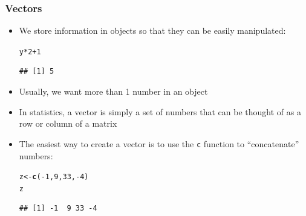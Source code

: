 \documentclass[color=usenames,dvipsnames]{beamer}\usepackage[]{graphicx}\usepackage[]{color}
\makeatletter
\newcommand{\hlnum}[1]{\textcolor[rgb]{0.686,0.059,0.569}{#1}}%
\newcommand{\hlopt}[1]{\textcolor[rgb]{0,0,0}{#1}}%
\newcommand{\hlstd}[1]{\textcolor[rgb]{0.345,0.345,0.345}{#1}}%
\newcommand{\hlkwb}[1]{\textcolor[rgb]{0.69,0.353,0.396}{#1}}%
\newcommand{\hlkwd}[1]{\textcolor[rgb]{0.737,0.353,0.396}{\textbf{#1}}}%
\newenvironment{kframe}{%
 \def\at@end@of@kframe{}%
 \ifinner\ifhmode%
  \def\at@end@of@kframe{\end{minipage}}%
  \begin{minipage}{\columnwidth}%
 \fi\fi%
 \def\FrameCommand##1{\hskip\@totalleftmargin \hskip-\fboxsep
 \colorbox{shadecolor}{##1}\hskip-\fboxsep
     \hskip-\linewidth \hskip-\@totalleftmargin \hskip\columnwidth}%
 \MakeFramed {\advance\hsize-\width
   \@totalleftmargin\z@ \linewidth\hsize
   \@setminipage}}%
 {\par\unskip\endMakeFramed%
 \at@end@of@kframe}
\newenvironment{knitrout}{}{} %
\makeatother
\begin{document}
\begin{frame}[fragile]
  \frametitle{Vectors}
  \begin{itemize}[<+->]
    \item We store information in objects so that they can be easily manipulated:
\begin{knitrout}
\color{fgcolor}\begin{kframe}
\begin{alltt}
\hlstd{y}\hlopt{*}\hlnum{2}\hlopt{+}\hlnum{1}
\end{alltt}
\begin{verbatim}
## [1] 5
\end{verbatim}
\end{kframe}
\end{knitrout}
    \item Usually, we want more than 1 number in an object
    \item In statistics, a vector is simply a set of numbers that can
      be thought of as a row or column of a matrix
    \item The easiest way to create a vector is to use the \verb+c+
       function to ``concatenate'' numbers:
\begin{knitrout}
\color{fgcolor}\begin{kframe}
\begin{alltt}
\hlstd{z} \hlkwb{<-} \hlkwd{c}\hlstd{(}\hlopt{-}\hlnum{1}\hlstd{,} \hlnum{9}\hlstd{,} \hlnum{33}\hlstd{,} \hlopt{-}\hlnum{4}\hlstd{)}
\hlstd{z}
\end{alltt}
\begin{verbatim}
## [1] -1  9 33 -4
\end{verbatim}
\end{kframe}
\end{knitrout}
  \end{itemize}
\end{frame}



\end{document}
